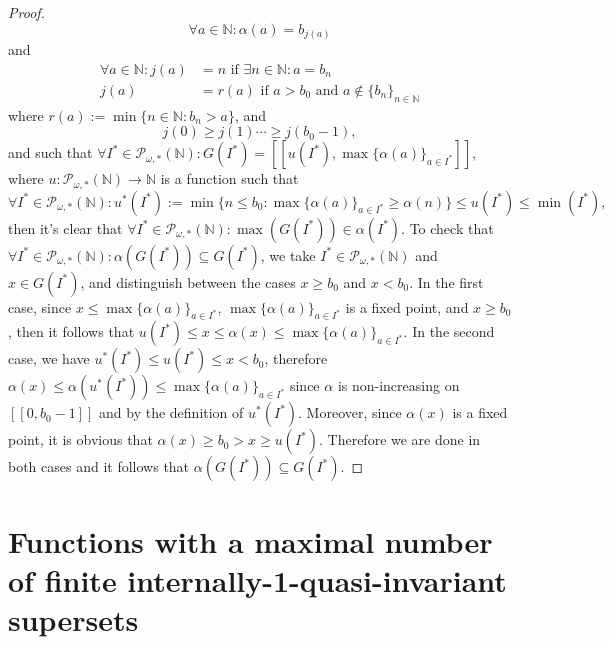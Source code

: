 \documentclass[a4paper,11pt]{article}
\theoremstyle{plain}
\theoremstyle{definition}
\theoremstyle{remark}
\begin{document}
\begin{proof}
\[ \forall a \in \mathbb{N} : \alpha(a) = b_{j(a)} \]
and
\begin{align*}
\forall a \in \mathbb{N} : j(a) &= n \text{ if } \exists n \in \mathbb{N} : a = b_n \\
j(a) &= r(a)  \text{ if } a > b_0 \text{ and } a \notin \{b_n\}_{n \in \mathbb{N}}
\end{align*}
where $r(a) := \min\{n \in \mathbb{N} : b_n > a \}$, and 
\[ j(0) \geq j(1) \cdots \geq j(b_0 - 1), \]
and such that $\forall I^* \in  \mathcal{P}_{\omega,*}(\mathbb{N}) : G(I^*) = [\![u(I^*),\max\{\alpha(a)\}_{a \in I^*}]\!]$, where $u : \mathcal{P}_{\omega,*}(\mathbb{N}) \to \mathbb{N}$ is a function such that 
\[ \forall I^* \in  \mathcal{P}_{\omega,*}(\mathbb{N}) : u^*(I^*) := \min \{n \leq b_0 : \max\{\alpha(a)\}_{a \in I^*} \geq \alpha(n) \} \leq u(I^*) \leq \min(I^*), \]
then it's clear that $\forall I^* \in  \mathcal{P}_{\omega,*}(\mathbb{N}) : \max(G(I^*)) \in \alpha(I^*)$. To check that $\forall I^* \in  \mathcal{P}_{\omega,*}(\mathbb{N}) : \alpha(G(I^*)) \subseteq G(I^*)$, we take $I^* \in  \mathcal{P}_{\omega,*}(\mathbb{N})$ and $x \in G(I^*)$, and distinguish between the cases $x \geq b_0$ and $x < b_0$. In the first case, since $x \leq \max\{\alpha(a)\}_{a \in I^*}$, $\max\{\alpha(a)\}_{a \in I^*}$ is a fixed point, and $x \geq b_0$, then it follows that $u(I^*) \leq x \leq \alpha(x) \leq \max\{\alpha(a)\}_{a \in I^*}$. In the second case, we have $u^*(I^*) \leq u(I^*) \leq x < b_0$, therefore $\alpha(x) \leq \alpha(u^*(I^*)) \leq \max\{\alpha(a)\}_{a \in I^*}$ since $\alpha$ is non-increasing on $[\![0,b_0-1]\!]$ and by the definition of $u^*(I^*)$. Moreover, since $\alpha(x)$ is a fixed point, it is obvious that $\alpha(x) \geq b_0 > x \geq u(I^*)$. Therefore we are done in both cases and it follows that $\alpha(G(I^*)) \subseteq G(I^*)$.
\end{proof}

























\section{Functions with a maximal number of finite internally-1-quasi-invariant supersets}
\label{sectionSuperPreservUnderDirectImageUpToOneElement}
\end{document}
